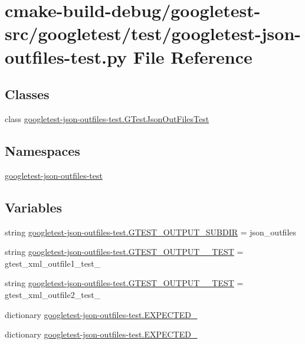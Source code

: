 \hypertarget{googletest-json-outfiles-test_8py}{}\section{cmake-\/build-\/debug/googletest-\/src/googletest/test/googletest-\/json-\/outfiles-\/test.py File Reference}
\label{googletest-json-outfiles-test_8py}
\subsection*{Classes}
\begin{DoxyCompactItemize}
\item 
class \mbox{\hyperlink{classgoogletest-json-outfiles-test_1_1GTestJsonOutFilesTest}{googletest-\/json-\/outfiles-\/test.\+G\+Test\+Json\+Out\+Files\+Test}}
\end{DoxyCompactItemize}
\subsection*{Namespaces}
\begin{DoxyCompactItemize}
\item 
 \mbox{\hyperlink{namespacegoogletest-json-outfiles-test}{googletest-\/json-\/outfiles-\/test}}
\end{DoxyCompactItemize}
\subsection*{Variables}
\begin{DoxyCompactItemize}
\item 
string \mbox{\hyperlink{namespacegoogletest-json-outfiles-test_a0f92f4080118c9ed4fce7412abfabf57}{googletest-\/json-\/outfiles-\/test.\+G\+T\+E\+S\+T\+\_\+\+O\+U\+T\+P\+U\+T\+\_\+\+S\+U\+B\+D\+IR}} = \textquotesingle{}json\+\_\+outfiles\textquotesingle{}
\item 
string \mbox{\hyperlink{namespacegoogletest-json-outfiles-test_ace9d5d61931b94cde9f088c67c08089d}{googletest-\/json-\/outfiles-\/test.\+G\+T\+E\+S\+T\+\_\+\+O\+U\+T\+P\+U\+T\+\_\+\_\+\+T\+E\+ST}} = \textquotesingle{}gtest\+\_\+xml\+\_\+outfile1\+\_\+test\+\_\+\textquotesingle{}
\item 
string \mbox{\hyperlink{namespacegoogletest-json-outfiles-test_af99178050ea2a9feaf2d569fcb5c3dae}{googletest-\/json-\/outfiles-\/test.\+G\+T\+E\+S\+T\+\_\+\+O\+U\+T\+P\+U\+T\+\_\+\_\+\+T\+E\+ST}} = \textquotesingle{}gtest\+\_\+xml\+\_\+outfile2\+\_\+test\+\_\+\textquotesingle{}
\item 
dictionary \mbox{\hyperlink{namespacegoogletest-json-outfiles-test_abf0c05f9a69a87f8625d3dd90cc16ed8}{googletest-\/json-\/outfiles-\/test.\+E\+X\+P\+E\+C\+T\+E\+D\+\_}}
\item 
dictionary \mbox{\hyperlink{namespacegoogletest-json-outfiles-test_a4340a105b9ff2d4a132e85a8b6af7d61}{googletest-\/json-\/outfiles-\/test.\+E\+X\+P\+E\+C\+T\+E\+D\+\_}}
\end{DoxyCompactItemize}
